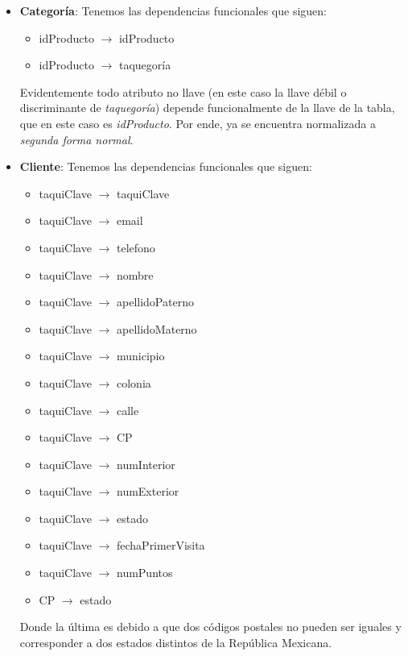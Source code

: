 \documentclass[11pt,letterpaper]{article}
\begin{document}
\begin{itemize}

\item \textbf{Categoría}: Tenemos las dependencias funcionales que siguen:

\begin{itemize}
\item idProducto $\rightarrow$ idProducto

\item idProducto $\rightarrow$ taquegoría
\end{itemize}

Evidentemente todo atributo no llave (en este caso la llave débil o discriminante de \textit{taquegoría}) depende funcionalmente de la llave de la tabla, que en este caso es \textit{idProducto}. Por ende, ya se encuentra normalizada a \textit{segunda forma normal}. 

\item \textbf{Cliente}: Tenemos las dependencias funcionales que siguen:

\begin{itemize}
\item taquiClave $\rightarrow$ taquiClave

\item taquiClave $\rightarrow$ email
\item taquiClave $\rightarrow$ telefono
\item taquiClave $\rightarrow$ nombre
\item taquiClave $\rightarrow$ apellidoPaterno
\item taquiClave $\rightarrow$ apellidoMaterno
\item taquiClave $\rightarrow$ municipio
\item taquiClave $\rightarrow$ colonia
\item taquiClave $\rightarrow$ calle
\item taquiClave $\rightarrow$ CP
\item taquiClave $\rightarrow$ numInterior
\item taquiClave $\rightarrow$ numExterior
\item taquiClave $\rightarrow$ estado
\item taquiClave $\rightarrow$ fechaPrimerVisita
\item taquiClave $\rightarrow$ numPuntos
\item CP $\rightarrow$ estado
\end{itemize}

Donde la última es debido a que dos códigos postales no pueden ser iguales y corresponder a dos estados distintos de la República Mexicana. \\


\end{itemize}
\end{document}
